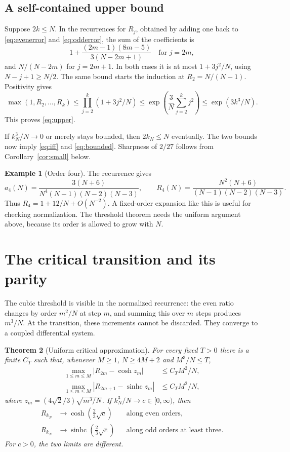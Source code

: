 \documentclass[11pt]{article}
\newtheorem{theorem}{Theorem}[section]
\theoremstyle{definition}
\newtheorem{example}[theorem]{Example}
\theoremstyle{remark}
\newcommand{\1}{\mathbf 1}
\newcommand{\shc}{\operatorname{sinhc}}
\begin{document}
\subsection{A self-contained upper bound}

Suppose $2k\le N$. In the recurrences for $R_j$, obtained by adding one back to \eqref{eq:evenerror} and \eqref{eq:odderror}, the sum of the coefficients is
\[
1+\frac{(2m-1)(8m-5)}{3(N-2m+1)}
\quad\text{for }j=2m,
\]
and $N/(N-2m)$ for $j=2m+1$. In both cases it is at most $1+3j^2/N$, using $N-j+1\ge N/2$. The same bound starts the induction at $R_2=N/(N-1)$. Positivity gives
\[
\max(1,R_2,\ldots,R_k)
\le\prod_{j=2}^k(1+3j^2/N)
\le\exp\left(\frac3N\sum_{j=2}^k j^2\right)
\le\exp(3k^3/N).
\]
This proves \eqref{eq:upper}.

If $k_N^3/N\to0$ or merely stays bounded, then $2k_N\le N$ eventually. The two bounds now imply \eqref{eq:iff} and \eqref{eq:bounded}. Sharpness of $2/27$ follows from Corollary~\ref{cor:small} below.

\begin{example}[Order four]
The recurrence gives
\[
a_4(N)=\frac{3(N+6)}{N^4(N-1)(N-2)(N-3)},\qquad
R_4(N)=\frac{N^2(N+6)}{(N-1)(N-2)(N-3)}.
\]
Thus $R_4=1+12/N+O(N^{-2})$. A fixed-order expansion like this is useful for checking normalization. The threshold theorem needs the uniform argument above, because its order is allowed to grow with $N$.
\end{example}


\clearpage
\section{The critical transition and its parity}\label{sec:critical}

The cubic threshold is visible in the normalized recurrence: the even ratio changes by order $m^2/N$ at step $m$, and summing this over $m$ steps produces $m^3/N$. At the transition, these increments cannot be discarded. They converge to a coupled differential system.

\begin{theorem}[Uniform critical approximation]\label{thm:critical}
For every fixed $T>0$ there is a finite $C_T$ such that, whenever $M\ge1$, $N\ge4M+2$ and $M^3/N\le T$,
\begin{align}
\max_{1\le m\le M}\left|R_{2m}-\cosh z_m\right|&\le C_T M^2/N,\label{eq:criticeven}\\
\max_{1\le m\le M}\left|R_{2m+1}-\shc z_m\right|&\le C_T M^2/N,\label{eq:criticodd}
\end{align}
where $z_m=(4\sqrt2/3)\sqrt{m^3/N}$. If $k_N^3/N\to c\in[0,\infty)$, then
\begin{align*}
R_{k_N}&\longrightarrow\cosh\left(\frac23\sqrt c\right)
&&\text{along even orders},\\
R_{k_N}&\longrightarrow\shc\left(\frac23\sqrt c\right)
&&\text{along odd orders at least three}.
\end{align*}
For $c>0$, the two limits are different.
\end{theorem}
\end{document}
